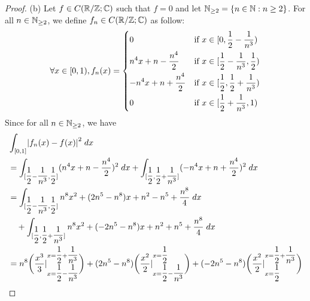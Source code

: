 \begin{proof}{(b)}
  Let \(f \in C(\mathbb{R} / \mathbb{Z} ; \mathbb{C})\) such that \(f = 0\) and let \(\mathbb{N}_{\geq 2} = \{n \in \mathbb{N} : n \geq 2\}\).
  For all \(n \in \mathbb{N}_{\geq 2}\), we define \(f_n \in C(\mathbb{R} / \mathbb{Z} ; \mathbb{C})\) as follow:
  \[
    \forall x \in [0, 1), f_n(x) = \begin{dcases}
      0                           & \text{if } x \in [0, \dfrac{1}{2} - \dfrac{1}{n^3})            \\
      n^4 x + n - \dfrac{n^4}{2}  & \text{if } x \in [\dfrac{1}{2} - \dfrac{1}{n^3}, \dfrac{1}{2}) \\
      -n^4 x + n + \dfrac{n^4}{2} & \text{if } x \in [\dfrac{1}{2}, \dfrac{1}{2} + \dfrac{1}{n^3}) \\
      0                           & \text{if } x \in [\dfrac{1}{2} + \dfrac{1}{n^3}, 1)
    \end{dcases}
  \]
  Since for all \(n \in \mathbb{N}_{\geq 2}\), we have
  \begin{align*}
     & \int_{[0, 1]} \abs{f_n(x) - f(x)}^2 \; dx                                                                                                                                                                                                                                                                      \\
     & = \int_{[\dfrac{1}{2} - \dfrac{1}{n^3}, \dfrac{1}{2}]} (n^4 x + n - \dfrac{n^4}{2})^2 \; dx + \int_{[\dfrac{1}{2}, \dfrac{1}{2} + \dfrac{1}{n^3}]} (-n^4 x + n + \dfrac{n^4}{2})^2 \; dx                                                                                                                       \\
     & = \int_{[\dfrac{1}{2} - \dfrac{1}{n^3}, \dfrac{1}{2}]} n^8 x^2 + (2n^5 - n^8) x + n^2 - n^5 + \dfrac{n^8}{4} \; dx                                                                                                                                                                                             \\
     & \quad + \int_{[\dfrac{1}{2}, \dfrac{1}{2} + \dfrac{1}{n^3}]} n^8 x^2 + (-2n^5 - n^8) x + n^2 + n^5 + \dfrac{n^8}{4} \; dx                                                                                                                                                                                      \\
     & = n^8 \bigg(\dfrac{x^3}{3}|_{x = \dfrac{1}{2} - \dfrac{1}{n^3}}^{x = \dfrac{1}{2} + \dfrac{1}{n^3}}\bigg) + (2n^5 - n^8) \bigg(\dfrac{x^2}{2}|_{x = \dfrac{1}{2} - \dfrac{1}{n^3}}^{x = \dfrac{1}{2}}\bigg) + (-2n^5 - n^8) \bigg(\dfrac{x^2}{2}|_{x = \dfrac{1}{2}}^{x = \dfrac{1}{2} + \dfrac{1}{n^3}}\bigg) \\

\end{align*}
\end{proof}
